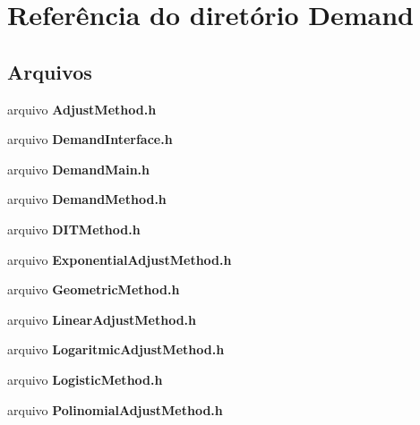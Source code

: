 \section{Referência do diretório Demand}
\label{dir_6eb5993dba92adb08f6c3209b76e9cb7}
\subsection*{Arquivos}
\begin{DoxyCompactItemize}
\item 
arquivo {\bf Adjust\+Method.\+h}
\item 
arquivo {\bf Demand\+Interface.\+h}
\item 
arquivo {\bf Demand\+Main.\+h}
\item 
arquivo {\bf Demand\+Method.\+h}
\item 
arquivo {\bf D\+I\+T\+Method.\+h}
\item 
arquivo {\bf Exponential\+Adjust\+Method.\+h}
\item 
arquivo {\bf Geometric\+Method.\+h}
\item 
arquivo {\bf Linear\+Adjust\+Method.\+h}
\item 
arquivo {\bf Logaritmic\+Adjust\+Method.\+h}
\item 
arquivo {\bf Logistic\+Method.\+h}
\item 
arquivo {\bf Polinomial\+Adjust\+Method.\+h}
\end{DoxyCompactItemize}
